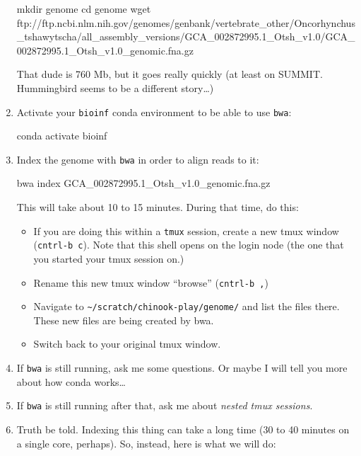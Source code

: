 \documentclass[]{krantz}
\makeatletter
\newenvironment{Shaded}{\begin{snugshade}}{\end{snugshade}}
\newcommand{\BuiltInTok}[1]{#1}
\newcommand{\ExtensionTok}[1]{#1}
\newcommand{\FunctionTok}[1]{\textcolor[rgb]{0,0,0}{#1}}
\newcommand{\NormalTok}[1]{#1}
\providecommand{\tightlist}{%
  \setlength{\itemsep}{0pt}\setlength{\parskip}{0pt}}
\newenvironment{kframe}{%
\medskip{}
\setlength{\fboxsep}{.8em}
 \def\at@end@of@kframe{}%
 \ifinner\ifhmode%
  \def\at@end@of@kframe{\end{minipage}}%
  \begin{minipage}{\columnwidth}%
 \fi\fi%
 \def\FrameCommand##1{\hskip\@totalleftmargin \hskip-\fboxsep
 \colorbox{shadecolor}{##1}\hskip-\fboxsep
     \hskip-\linewidth \hskip-\@totalleftmargin \hskip\columnwidth}%
 \MakeFramed {\advance\hsize-\width
   \@totalleftmargin\z@ \linewidth\hsize
   \@setminipage}}%
 {\par\unskip\endMakeFramed%
 \at@end@of@kframe}
\renewenvironment{Shaded}{\begin{kframe}}{\end{kframe}}
\makeatother
\begin{document}
\begin{enumerate}
\begin{Shaded}
\begin{Highlighting}[]
 \FunctionTok{mkdir}\NormalTok{ genome}
 \BuiltInTok{cd}\NormalTok{ genome}
 \FunctionTok{wget}\NormalTok{ ftp://ftp.ncbi.nlm.nih.gov/genomes/genbank/vertebrate_other/Oncorhynchus_tshawytscha/all_assembly_versions/GCA_002872995.1_Otsh_v1.0/GCA_002872995.1_Otsh_v1.0_genomic.fna.gz}
\end{Highlighting}
\end{Shaded}

  That dude is 760 Mb, but it goes really quickly (at least on SUMMIT. Hummingbird seems to be a different story\ldots{})
\item
  Activate your \texttt{bioinf} conda environment to be able to use \texttt{bwa}:

\begin{Shaded}
\begin{Highlighting}[]
\ExtensionTok{conda}\NormalTok{ activate bioinf}
\end{Highlighting}
\end{Shaded}
\item
  Index the genome with \texttt{bwa} in order to align reads to it:

\begin{Shaded}
\begin{Highlighting}[]
\ExtensionTok{bwa}\NormalTok{ index GCA_002872995.1_Otsh_v1.0_genomic.fna.gz }
\end{Highlighting}
\end{Shaded}

  This will take about 10 to 15 minutes. During that time, do this:

  \begin{itemize}
  \tightlist
  \item
    If you are doing this within a \texttt{tmux} session, create a new tmux window (\texttt{cntrl-b\ c}). Note that this shell opens on the login node (the one that you started your tmux session on.)
  \item
    Rename this new tmux window ``browse'' (\texttt{cntrl-b\ ,})
  \item
    Navigate to \texttt{\textasciitilde{}/scratch/chinook-play/genome/} and list the files there. These new files
    are being created by bwa.
  \item
    Switch back to your original tmux window.
  \end{itemize}
\item
  If \texttt{bwa} is still running, ask me some questions. Or maybe I will tell you more about how conda works\ldots{}
\item
  If \texttt{bwa} is still running after that, ask me about \emph{nested tmux sessions}.
\item
  Truth be told. Indexing this thing can take a long time (30 to 40 minutes on a single core, perhaps). So,
  instead, here is what we will do:


\end{enumerate}
\end{document}
